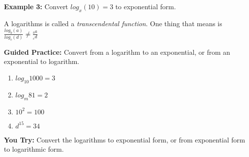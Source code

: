 \documentclass[12pt]{article}
\begin{document}
\vspace{1cm}

\textbf{Example 3:} Convert $log_{x}(10)=3$ to exponential form.\\

\vspace{1cm}

A logarithms is called a \textit{transcendental function}. One thing that means is $\frac{log_{b}(a)}{log_{c}(d)} \neq \frac{_ba}{_cd}$\\

\hrulefill

\textbf{Guided Practice:} Convert from a logarithm to an exponential, or from an exponential to logarithm.\\

\begin{multicols}{2}
\begin{enumerate}
	\setlength\itemsep{1cm}
	
	\item $log_{10}1000=3$\\
	
	\item $log_m{81}=2$\\
	
	\item $10^{2}=100$\\
	
	\item $d^{15}=34$\\

\end{enumerate}
\end{multicols}

\pagebreak

\textbf{You Try:} Convert the logarithms to exponential form, or from exponential form to logarithmic form.\\
\end{document}
